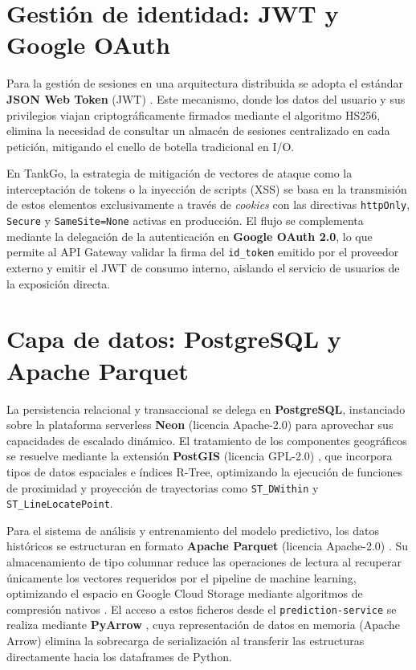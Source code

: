 \section{Gestión de identidad: JWT y Google OAuth}
Para la gestión de sesiones en una arquitectura distribuida se adopta el estándar
\textbf{JSON Web Token} (JWT) \cite{jwt_rfc7519}. Este mecanismo, donde los datos del usuario y sus privilegios viajan criptográficamente
firmados mediante el algoritmo HS256,  elimina la necesidad de consultar un almacén de
sesiones centralizado en cada petición, mitigando el cuello de botella tradicional en I/O.

En TankGo, la estrategia de mitigación de vectores de ataque como la interceptación de
tokens o la inyección de scripts (XSS) \cite{owasp_xss} se basa en la transmisión de
estos elementos exclusivamente a través de \textit{cookies} con las directivas
\texttt{httpOnly}, \texttt{Secure} y \texttt{SameSite=None} activas en producción.
El flujo se complementa mediante la delegación de la autenticación en \textbf{Google OAuth 2.0},
lo que permite al API Gateway validar la firma del \texttt{id\_token} emitido por el proveedor
externo y emitir el JWT de consumo interno, aislando el servicio de usuarios de la exposición directa.

\section{Capa de datos: PostgreSQL y Apache Parquet}
La persistencia relacional y transaccional se delega en \textbf{PostgreSQL}, instanciado
sobre la plataforma serverless \textbf{Neon} (licencia Apache-2.0) \cite{neon_tech2026} para aprovechar sus capacidades de
escalado dinámico. El tratamiento de los componentes geográficos se resuelve mediante la
extensión \textbf{PostGIS} (licencia GPL-2.0) \cite{postgis}, que incorpora tipos de datos espaciales e índices
R-Tree, optimizando la ejecución de funciones de proximidad y proyección de trayectorias como
\texttt{ST\_DWithin} y \texttt{ST\_LineLocatePoint}.

Para el sistema de análisis y entrenamiento del modelo predictivo, los datos históricos
se estructuran en formato \textbf{Apache Parquet} (licencia Apache-2.0) \cite{databricks_parquet}. Su almacenamiento de tipo
columnar reduce las operaciones de lectura al recuperar únicamente los vectores
requeridos por el pipeline de machine learning, optimizando el espacio en Google Cloud Storage mediante
algoritmos de compresión nativos \cite{datacamp_parquet}. El acceso a estos ficheros desde el
\texttt{prediction-service} se realiza mediante \textbf{PyArrow} \cite{pyarrow}, cuya representación de datos en memoria
(Apache Arrow) elimina la sobrecarga de serialización al transferir las estructuras directamente hacia los dataframes de Python.

